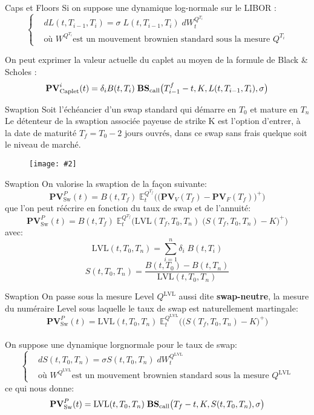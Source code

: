 \documentclass{beamer}
\newcommand{\FIG}[2]{\texttt{[image: \#2]}}
\begin{document}
\begin{frame}{Caps et Floors}
Si on suppose une dynamique log-normale sur le LIBOR :
\[
\left\{
\begin{split}
&dL(t,T_{i-1},T_i)=\sigma\;L(t,T_{i-1},T_i) \;dW_t^{Q^{T_i}}\\
&\text{où } W^{Q^{T_i}}\text{est un mouvement brownien standard sous la mesure }Q^{T_i}
\end{split}
\right.
\]

On peut exprimer la valeur actuelle du caplet au moyen de la formule de Black \& Scholes  :
\[
\textbf{PV}_\text{Caplet}^i(t)=\delta_i B(t,T_i) \;\text{\textbf{BS}}_\text{call}\big(T_{i-1}^f-t,K,L(t,T_{i-1},T_i),\sigma\big)
\]

\end{frame}

\begin{frame}{Swaption}
Soit l'échéancier d'un swap standard qui démarre en $T_0$ et mature en $T_n$\\
Le détenteur de la swaption associée payeuse de strike K est l'option d'entrer, à la date de maturité $T_f=T_0-2\text{ jours ouvrés}$,  dans ce swap sans frais quelque soit le niveau de marché.
\begin{figure}[h]
\FIG{10cm}{figures/schema_swaption.jpg}
\end{figure}
\end{frame}
\begin{frame}{Swaption}
On valorise la swaption de la façon suivante:
\[
\textbf{PV}_\text{Sw}^P(t)=B(t,T_f)\;\mathbb{E}_t^{Q^{T_f}}\Big(\big(\textbf{PV}_V(T_f)-\textbf{PV}_F(T_f)\big)^+\Big)
\]
que l'on peut réécrire en fonction du taux de swap et de l'annuité:
\[
\textbf{PV}_\text{Sw}^P(t)=B(t,T_f)\;\mathbb{E}_t^{Q^{T_f}}\Big(\text{LVL}(T_f,T_0,T_n)\;\big(S(T_f,T_0,T_n)-K\big)^+\Big)
\]
avec:
\[
\text{LVL}(t,T_0,T_n)=\sum_{i=1}^{n}\delta_i \;B(t,T_i)
\]
\[
S(t,T_0,T_n)= \frac{B(t,T_0)-B(t,T_n)}{\text{LVL}(t,T_0,T_n)}
\]
\end{frame}

\begin{frame}{Swaption}
On passe sous la mesure Level $Q^{\text{LVL}}$ aussi dite \textbf{swap-neutre}, la mesure du numéraire Level sous laquelle le taux de swap est naturellement martingale:
\[
\textbf{PV}_\text{Sw}^P(t)=\text{LVL}(t,T_0,T_n)\;\mathbb{E}_t^{Q^{\text{LVL}}}\Big(\big(S(T_f,T_0,T_n)-K\big)^+\Big)
\]
\\
On suppose une dynamique lorgnormale pour le taux de swap:
\[
\left\{
\begin{split}
&dS(t,T_0,T_n)=\sigma S(t,T_0,T_n) \;dW_t^{Q^{\text{LVL}}}\\
&\text{où } W^{Q^{\text{LVL}}}\text{est un mouvement brownien standard sous la mesure }Q^{\text{LVL}}
\end{split}
\right.
\]
ce qui nous donne:
\[
\textbf{PV}_\text{Sw}^P(t)=\text{LVL}(t,T_0,T_n) \;\text{\textbf{BS}}_\text{call}\big(T_f-t,K,S(t,T_{0},T_n),\sigma\big)
\]
\end{frame}
\end{document}
